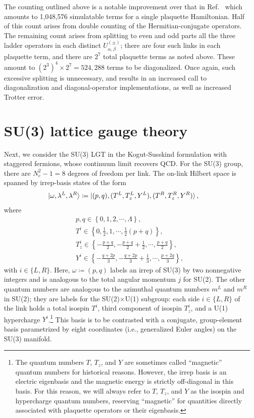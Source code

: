 \documentclass[aps,prd,twocolumn,showpacs,groupedaddress,superscriptaddress,nofootinbib,floatfix,preprintnumbers,longbibliography]{revtex4-1}
\begin{document}
The counting outlined above is a notable improvement over that in Ref.~\cite{Kan:2021xfc} which amounts to 1,048,576 simulatable terms for a single plaquette Hamiltonian. Half of this count arises from double counting of the Hermitian-conjugate operators. The remaining count arises from splitting to even and odd parts all the three ladder operators in each distinct $U_{\alpha,\beta}^{(\pm)}$; there are four such links in each plaquette term, and there are $2^7$ total plaquette terms as noted above. These amount to $(2^3)^4 \times 2^7 = 524,288 $ terms to be diagonalized. Once again, such excessive splitting is unnecessary, and results in an increased call to diagonalization and diagonal-operator implementations, as well as increased Trotter error.



\section{SU(3) lattice gauge theory
\label{sec:SU(3)}
}
Next, we consider the SU(3) LGT in the Kogut-Susskind formulation with staggered fermions, whose continuum limit recovers QCD. For the SU(3) group, there are $N_c^2-1=8$ degrees of freedom per link. The on-link Hilbert space is spanned by irrep-basis states of the form
%
\begin{align}
    \ket{\omega , \lambda^L , \lambda^R } &\coloneq \ket{(p,q) , ( T^L, T^{L}_z, Y^L) , ( T^R, T^{R}_z, Y^R)},
\end{align}
%
where
%
\begin{align}
&p,q \in \left\{0,1,2,\cdots, \Lambda\right\},
\\
&T^{i} \in \left\{0, \frac{1}{2}, 1, \cdots, \frac{1}{2} (p+q)\right\},
\\
&T^{i}_z \in \left\{-\frac{p+q}{2} ,-\frac{p+q}{2} +\frac{1}{2},
\cdots,\frac{p+q}{2}\right\},
\\
&Y^{i} \in \left\{-\frac{q+2p}{3},-\frac{q+2p}{3}+\frac{1}{3},
\cdots,\frac{p+2q}{3}\right\},
\end{align}
%
with $i \in \{L,R\}$. Here, $\omega\coloneq(p,q)$ labels an irrep of SU(3) by two nonnegative integers and is analogous to the total angular momentum $j$ for SU(2).
The other quantum numbers are analogous to the azimuthal quantum numbers $m^{L}$ and $m^{R}$ in SU(2); they are labels for the SU(2)$\times$U(1) subgroup:
each side $i \in \{L,R\}$ of the link holds a total isospin $T^i$, third component of isospin $T^{i}_z$, and a U(1) hypercharge $Y^i$.\footnote{The quantum numbers $T$, $T_z$, and $Y$ are sometimes called ``magnetic'' quantum numbers for historical reasons. However, the irrep basis is an electric eigenbasis and the magnetic energy is strictly off-diagonal in this basis. For this reason, we will always refer to $T$, $T_z$, and $Y$ as the isospin and hypercharge quantum numbers, reserving ``magnetic'' for quantities directly associated with plaquette operators or their eigenbasis.}
This basis is to be contrasted with a conjugate, group-element basis parametrized by eight coordinates (i.e., generalized Euler angles) on the SU(3) manifold.
\end{document}
